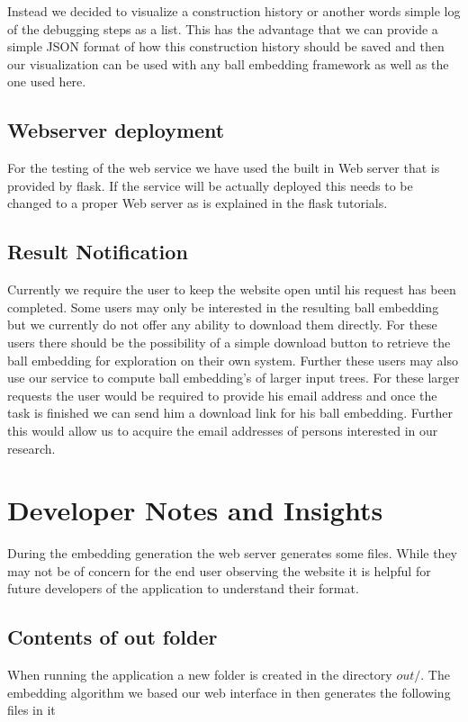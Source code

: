 \documentclass[]{article}
\begin{document}
Instead we decided to visualize a construction history or another words simple log of the debugging steps as a list. This has the advantage that we can provide a simple JSON format of how this construction history should be saved and then our visualization can be used with any ball embedding framework as well as the one used here.
\subsection{Webserver deployment}
For the testing of the web service we have used the built in Web server that is provided by flask. If the service will be actually deployed this needs to be changed to a proper Web server as is explained in the flask tutorials.
\subsection{Result Notification}
Currently we require the user to keep the website open until his request has been completed. Some users may only be interested in the resulting ball embedding but we currently do not offer any ability to download them directly. For these users there should be the possibility of a simple download button to retrieve the ball embedding for exploration on their own system. Further these users may also use our service to compute ball embedding's of larger input trees. For these larger requests the user would be required to provide his email address and once the task is finished we can send him a download link for his ball embedding. Further this would allow us to acquire the email addresses of persons interested in our research.


\section{Developer Notes and Insights}
During the embedding generation the web server generates some files. While they may not be of concern for the end user observing the website it is helpful for future developers of the application to understand their format.

\subsection{Contents of out folder}
When running the application a new folder is created in the directory $out/$. The embedding algorithm we based our web interface in then generates the following files in it
\end{document}
